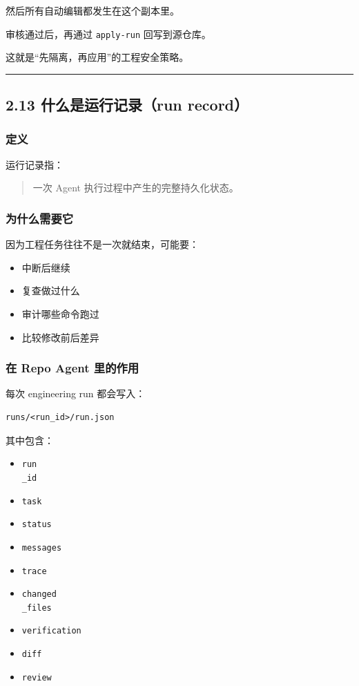 \documentclass[UTF8,12pt,openany]{ctexbook}
\begin{document}
然后所有自动编辑都发生在这个副本里。  \par
审核通过后，再通过 \texttt{apply-run} 回写到源仓库。\par

这就是“先隔离，再应用”的工程安全策略。\par

\hrule

\subsection{2.13 什么是运行记录（run record）}

\subsubsection{定义}

运行记录指：\par

\begin{quote}
一次 Agent 执行过程中产生的完整持久化状态。
\end{quote}

\subsubsection{为什么需要它}

因为工程任务往往不是一次就结束，可能要：\par

\begin{itemize}
\item 中断后继续
\item 复查做过什么
\item 审计哪些命令跑过
\item 比较修改前后差异
\end{itemize}

\subsubsection{在 Repo Agent 里的作用}

每次 engineering run 都会写入：\par

\begin{lstlisting}
runs/<run_id>/run.json
\end{lstlisting}

其中包含：\par

\begin{itemize}
\item \texttt{run\\_id}
\item \texttt{task}
\item \texttt{status}
\item \texttt{messages}
\item \texttt{trace}
\item \texttt{changed\\_files}
\item \texttt{verification}
\item \texttt{diff}
\item \texttt{review}
\end{itemize}
\end{document}
